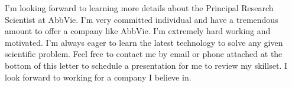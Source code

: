 \documentclass[11pt,a4paper,sans]{moderncv}        %
\newcommand{\Position}{Principal Research Scientist }
\newcommand{\Company}{AbbVie}
\begin{document}
I'm looking forward to learning more details about the \Position at \Company. I'm very committed individual and have a tremendous amount to offer a company like \Company. I'm extremely hard working and motivated. I'm always eager to learn the latest technology to solve any given scientific problem. Feel free to contact me by email or phone attached at the bottom of this letter to schedule a presentation for me to review my skillset. I look forward to working for a company I believe in. 

\makeletterclosing
\end{document}
